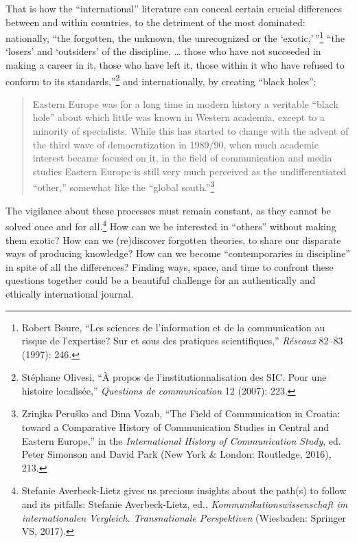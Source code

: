 \documentclass{tufte-handout}
\begin{document}
That is how the ``international'' literature can conceal certain crucial
differences between and within countries, to the detriment of the most
dominated: nationally, ``the forgotten, the unknown, the unrecognized or
the `exotic,'\,''\footnote{Robert Boure, ``Les sciences de l'information et de la communication
  au risque de l'expertise? Sur et sous des pratiques scientifiques,''
  \emph{Réseaux} 82--83 (1997): 246.
} ``the `losers'
and `outsiders' of the discipline, \ldots{} those who have not succeeded
in making a career in it, those who have left it, those within it who
have refused to conform to its
standards,''\footnote{Stéphane Olivesi, ``À propos de l'institutionnalisation des SIC. Pour
  une histoire localisée,'' \emph{Questions de communication} 12 (2007):
  223.
} and internationally,
by creating ``black holes'':

\begin{quote}
Eastern Europe was for a long time in modern history a veritable ``black
hole'' about which little was known in Western academia, except to a
minority of specialists. While this has started to change with the
advent of the third wave of democratization in 1989/90, when much
academic interest became focused on it, in the field of communication
and media studies Eastern Europe is still very much perceived as the
undifferentiated ``other,'' somewhat like the ``global
south.''\footnote{Zrinjka Peruško and Dina Vozab, ``The Field of Communication in
  Croatia: toward a Comparative History of Communication Studies in
  Central and Eastern Europe,'' in the \emph{International History of
  Communication Study}, ed. Peter Simonson and David Park (New York \&
  London: Routledge, 2016), 213.
}
\end{quote}

The vigilance about these processes must remain constant, as they cannot
be solved once and for all.\footnote{ Stefanie Averbeck-Lietz gives us precious insights about the path(s)
  to follow and its pitfalls: Stefanie Averbeck-Lietz, ed.,
  \emph{Kommunikationswissenschaft im internationalen Vergleich.
  Transnationale Perspektiven} (Wiesbaden: Springer VS, 2017).} How
can we be interested in ``others'' without making them exotic? How can
we (re)discover forgotten theories, to share our disparate ways of
producing knowledge? How can we become ``contemporaries in discipline''
in spite of all the differences? Finding ways, space, and time to
confront these questions together could be a beautiful challenge for an
authentically and ethically international journal.
\end{document}
